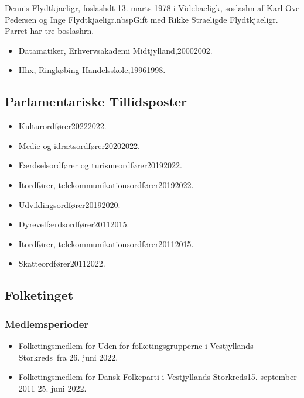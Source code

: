 \documentclass[11pt, a4paper]{awesome-cv}
\begin{document}
\makecvheader[R]
\makelettertitle
\begin{cvletter}
Dennis Flydtkjaeligr, foslashdt 13. marts 1978 i Videbaeligk, soslashn af Karl Ove Pedersen og Inge Flydtkjaeligr.nbspGift med Rikke Straeligde Flydtkjaeligr. Parret har tre boslashrn.

\begin{itemize}
\item Datamatiker, Erhvervsakademi Midtjylland,20002002.
\item Hhx, Ringkøbing Handelsskole,19961998.
\end{itemize}
\subsection*{Parlamentariske Tillidsposter}
\begin{itemize}
\item Kulturordfører20222022.
\item Medie og idrætsordfører20202022.
\item Færdselsordfører og turismeordfører20192022.
\item Itordfører, telekommunikationsordfører20192022.
\item Udviklingsordfører20192020.
\item Dyrevelfærdsordfører20112015.
\item Itordfører, telekommunikationsordfører20112015.
\item Skatteordfører20112022.
\end{itemize}
\subsection*{Folketinget}
\subsubsection*{Medlemsperioder}
\begin{itemize}
\item Folketingsmedlem for Uden for folketingsgrupperne i Vestjyllands Storkreds fra 26. juni 2022.
\item Folketingsmedlem for Dansk Folkeparti i Vestjyllands Storkreds15. september 2011  25. juni 2022.
\end{itemize}

\end{cvletter}
\end{document}
